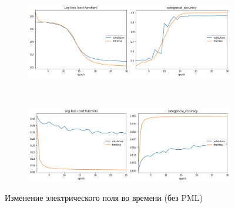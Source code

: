 \begin{figure}[p]
\bigskip
    \begin{subfigure}[b]{0.485\textwidth}
        \includegraphics[width=\textwidth]{include/graphics/experimental_plots/color/french_wow}
    \end{subfigure}
    ~
    \begin{subfigure}[b]{0.485\textwidth}
        \includegraphics[width=\textwidth]{include/graphics/experimental_plots/color/mixed_wow}
    \end{subfigure}

    \caption{Изменение электрического поля во времени (без PML)}\label{fig:EzPmlOff}
\end{figure}

\clearpage
